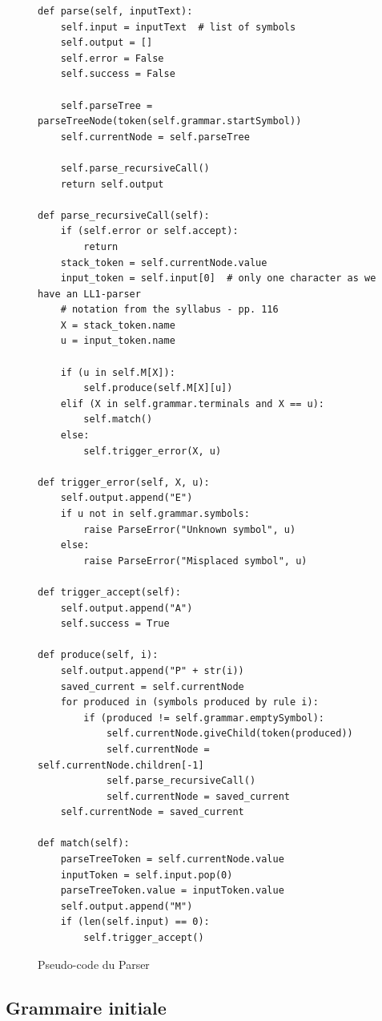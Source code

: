 \documentclass[a4paper,10pt]{article}
\begin{document}
\begin{figure}[H]
\begin{lstlisting}
def parse(self, inputText):
	self.input = inputText  # list of symbols
	self.output = []
	self.error = False
	self.success = False

	self.parseTree = parseTreeNode(token(self.grammar.startSymbol))
	self.currentNode = self.parseTree

	self.parse_recursiveCall()
	return self.output

def parse_recursiveCall(self):
	if (self.error or self.accept):
		return
	stack_token = self.currentNode.value
	input_token = self.input[0]  # only one character as we have an LL1-parser
	# notation from the syllabus - pp. 116
	X = stack_token.name
	u = input_token.name

	if (u in self.M[X]):
		self.produce(self.M[X][u])
	elif (X in self.grammar.terminals and X == u):
		self.match()
	else:
		self.trigger_error(X, u)

def trigger_error(self, X, u):
	self.output.append("E")
	if u not in self.grammar.symbols:
		raise ParseError("Unknown symbol", u)
	else:
		raise ParseError("Misplaced symbol", u)

def trigger_accept(self):
	self.output.append("A")
	self.success = True

def produce(self, i):
	self.output.append("P" + str(i))
	saved_current = self.currentNode
	for produced in (symbols produced by rule i):
		if (produced != self.grammar.emptySymbol):
			self.currentNode.giveChild(token(produced))
			self.currentNode = self.currentNode.children[-1]
			self.parse_recursiveCall()
			self.currentNode = saved_current
	self.currentNode = saved_current

def match(self):
	parseTreeToken = self.currentNode.value
	inputToken = self.input.pop(0)
	parseTreeToken.value = inputToken.value
	self.output.append("M")
	if (len(self.input) == 0):
		self.trigger_accept()
\end{lstlisting}
\fontfamily{}
\caption{Pseudo-code du Parser}
\label{lst:parser}
\end{figure}

 
\subsection{Grammaire initiale}\label{gramm-init}
\end{document}
